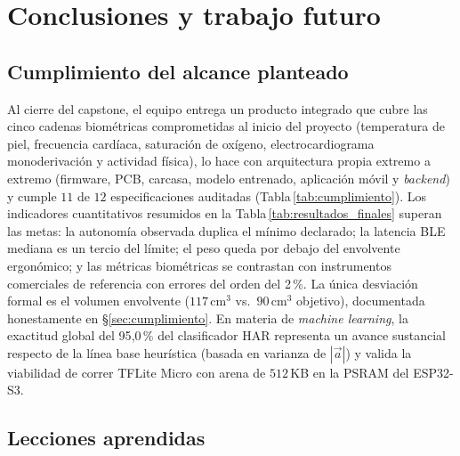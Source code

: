 \documentclass[letterpaper,11pt]{article}
\newcommand{\rtabla}[1]{Tabla\,\ref{#1}}
\begin{document}
\newpage

\section{Conclusiones y trabajo futuro}\label{sec:conclu}

\subsection{Cumplimiento del alcance planteado}

Al cierre del capstone, el equipo entrega un producto integrado que cubre las cinco cadenas biom\'etricas comprometidas al inicio del proyecto (temperatura de piel, frecuencia card\'iaca, saturaci\'on de ox\'igeno, electrocardiograma monoderivaci\'on y actividad f\'isica), lo hace con arquitectura propia extremo a extremo (firmware, PCB, carcasa, modelo entrenado, aplicaci\'on m\'ovil y \textit{backend}) y cumple $11$ de $12$ especificaciones auditadas (\rtabla{tab:cumplimiento}). Los indicadores cuantitativos resumidos en la \rtabla{tab:resultados_finales} superan las metas: la autonom\'ia observada duplica el m\'inimo declarado; la latencia BLE mediana es un tercio del l\'imite; el peso queda por debajo del envolvente ergon\'omico; y las m\'etricas biom\'etricas se contrastan con instrumentos comerciales de referencia con errores del orden del 2\,\%. La \'unica desviaci\'on formal es el volumen envolvente ($117$\,cm$^3$ vs.\ $90$\,cm$^3$ objetivo), documentada honestamente en \S\ref{sec:cumplimiento}. En materia de \textit{machine learning}, la exactitud global del 95{,}0\,\% del clasificador HAR representa un avance sustancial respecto de la l\'inea base heur\'istica (basada en varianza de $|\vec a|$) y valida la viabilidad de correr TFLite Micro con arena de $512$\,KB en la PSRAM del ESP32-S3.

\subsection{Lecciones aprendidas}
\end{document}
